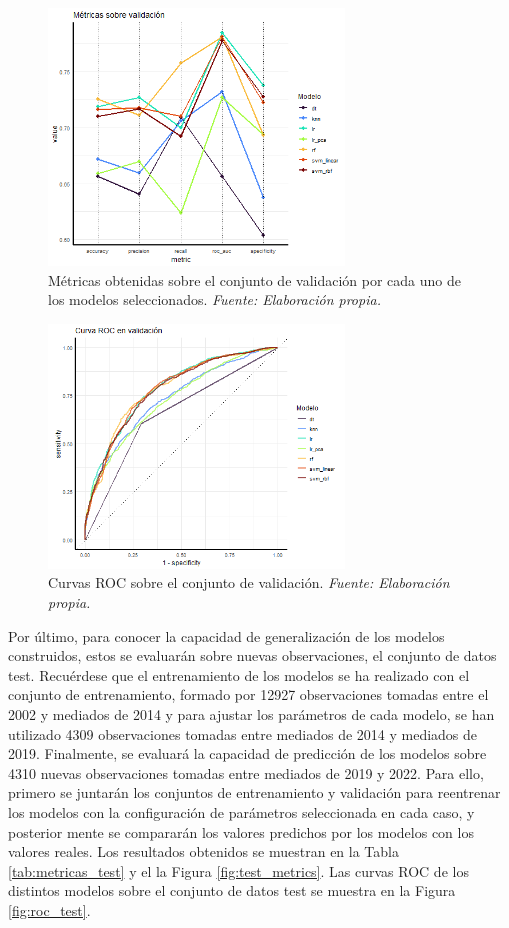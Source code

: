 \documentclass[12pt,a4paper,]{book}
\numberwithin{dummy}{section}
\theoremstyle{ocrenumbox}
\theoremstyle{blacknumex}
\theoremstyle{blacknumbox}
\theoremstyle{ocrenum}
\theoremstyle{ocrenum}
\begin{document}
\begin{figure}[h]
\centering
\includegraphics[width =0.7\textwidth]{graficos/validation_metrics.png}
\caption{Métricas obtenidas sobre el conjunto de validación por cada uno de los modelos seleccionados. \it Fuente: Elaboración propia.}
\label{fig:validation_metrics}
\end{figure}

\begin{figure}[h]
\centering
\includegraphics[width =0.7\textwidth]{graficos/roc_validation.png}
\caption{Curvas ROC sobre el conjunto de validación. \it Fuente: Elaboración propia.}
\label{fig:roc_validation}
\end{figure}

Por último, para conocer la capacidad de generalización de los modelos
construidos, estos se evaluarán sobre nuevas observaciones, el conjunto
de datos test. Recuérdese que el entrenamiento de los modelos se ha
realizado con el conjunto de entrenamiento, formado por 12927
observaciones tomadas entre el 2002 y mediados de 2014 y para ajustar
los parámetros de cada modelo, se han utilizado 4309 observaciones
tomadas entre mediados de 2014 y mediados de 2019. Finalmente, se
evaluará la capacidad de predicción de los modelos sobre 4310 nuevas
observaciones tomadas entre mediados de 2019 y 2022. Para ello, primero
se juntarán los conjuntos de entrenamiento y validación para reentrenar
los modelos con la configuración de parámetros seleccionada en cada
caso, y posterior mente se compararán los valores predichos por los
modelos con los valores reales. Los resultados obtenidos se muestran en
la Tabla \ref{tab:metricas_test} y el la Figura \ref{fig:test_metrics}.
Las curvas ROC de los distintos modelos sobre el conjunto de datos test
se muestra en la Figura \ref{fig:roc_test}.
\end{document}
